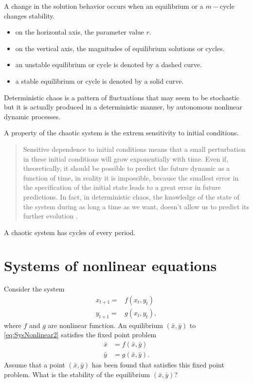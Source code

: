 A change in the solution behavior occurs when an equilibrium or a $m-$cycle changes stability.

\begin{itemize}
\item on the horizontal axis, the parameter value $r$.
\item on the vertical axis, the magnitudes of equilibrium solutions or cycles.
\item an unstable equilibrium or cycle is denoted by a dashed curve.
\item a stable equilibrium or cycle is denoted by a solid curve.
\end{itemize}


\begin{definition}
Deterministic chaos is a pattern of fluctuations that may seem to be stochastic but it is actually produced in a deterministic manner, by autonomous nonlinear dynamic processes.
\end{definition}

A property of the chaotic system is the extrem sensitivity to initial conditions. 
\begin{quote} 
Sensitive dependence to initial conditions means that
a small perturbation in these initial conditions will grow exponentially with time. Even
if, theoretically, it should be possible to predict the future dynamic as a function of
time, in reality it is impossible, because the smallest error in the specification of the
initial state leads to a great error in future predictions. In fact, in deterministic chaos,
the knowledge of the state of the system during as long a time as we want, doesn't
allow us to predict its further evolution \cite{Glass1988}.
\end{quote}

A chaotic system has cycles of every period.

\section{Systems of nonlinear equations}
Consider the system
\begin{equation}
\begin{array}{cc}
x_{t+1}=& f(x_t,y_t)\\
y_{t+1}=& g(x_t,y_t),
\end{array}\label{eq:SysNonlinear2}
\end{equation}
where $f$ and $g$ are nonlinear function. An equilibrium $(\bar x, \bar y)$ to \eqref{eq:SysNonlinear2} satisfies the fixed point problem
\begin{align*}
\bar x &= f(\bar x,\bar y) \\
\bar y &= g(\bar x,\bar y).
\end{align*}
Assume that a point $(\bar x,\bar y)$ has been found that satisfies this fixed point problem. What is the stability of the equilibrium $(\bar x,\bar y)$?

